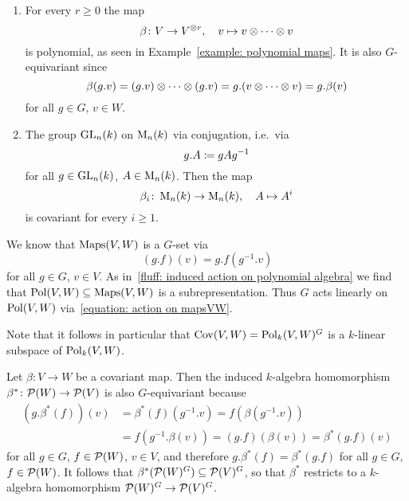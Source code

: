 \begin{example}
  \leavevmode
  \begin{enumerate}
    \item
      For every $r \geq 0$ the map
      \[
                \beta
        \colon  V \to V^{\mathbin{\otimes} r},
        \quad   v
        \mapsto v \mathbin{\otimes} \dotsb \mathbin{\otimes} v
      \]
      is polynomial, as seen in Example~\ref{example: polynomial maps}.
      It is also $G$-equivariant since
      \[
          \beta(g.v)
        = (g.v) \mathbin{\otimes} \dotsb \mathbin{\otimes} (g.v)
        = g.(v \mathbin{\otimes} \dotsb \mathbin{\otimes} v)
        = g.\beta(v)
      \]
      for all $g \in G$, $v \in W$.
    \item
      The group $\operatorname{GL}_n(k)$ on $\operatorname{M}_n(k)$ via conjugation, i.e.\ via
      \[
                  g.A
        \coloneqq  gAg^{-1}
      \]
      for all $g \in \operatorname{GL}_n(k)$, $A \in \operatorname{M}_n(k)$.
      Then the map
      \[
                \beta_i 
        \colon  \operatorname{M}_n(k) 
        \to     \operatorname{M}_n(k),
        \quad   A
        \mapsto A^i
      \]
      is covariant for every $i \geq 1$. 
  \end{enumerate}
\end{example}


\begin{fluff}
% 
% 
  We know that $\operatorname{Maps}(V,W)$ is a $G$-set via
  \begin{equation}
    \label{equation: action on mapsVW}
      (g.f)(v)
    = g.f\left( g^{-1}.v \right)
  \end{equation}
  for all $g \in G$, $v \in V$.
  As in~\ref{fluff: induced action on polynomial algebra} we find that $\operatorname{Pol}(V,W) \subseteq \operatorname{Maps}(V,W)$ is a subrepresentation.
  Thus $G$ acts linearly on $\operatorname{Pol}(V,W)$ via~\eqref{equation: action on mapsVW}.
  
  Note that it follows in particular that $\operatorname{Cov}(V,W) = \operatorname{Pol}_k(V,W)^G$ is a $k$-linear subspace of $\operatorname{Pol}_k(V,W)$.
  
  Let $\beta \colon V \to W$ be a covariant map.
  Then the induced $k$-algebra homomorphism $\beta^* \colon \mathcal{P}(W) \to \mathcal{P}(V)$ is also $G$-equivariant because
  \begin{align*}
        (g.\beta^*(f))(v)
    &=  \beta^*(f)(g^{-1}.v)
     =  f(\beta(g^{-1}.v))  \\
    &=  f(g^{-1}.\beta(v))
     =  (g.f)(\beta(v))
     =  \beta^*(g.f)(v)
  \end{align*}
  for all $g \in G$, $f \in \mathcal{P}(W)$, $v \in V$, and therefore $g.\beta^*(f) = \beta^*(g.f)$ for all $g \in G$, $f \in \mathcal{P}(W)$.
  It follows that $\beta^*(\mathcal{P}(W)^G) \subseteq \mathcal{P}(V)^G$, so that $\beta^*$ restricts to a $k$-algebra homomorphism $\mathcal{P}(W)^G \to \mathcal{P}(V)^G$.
\end{fluff}


